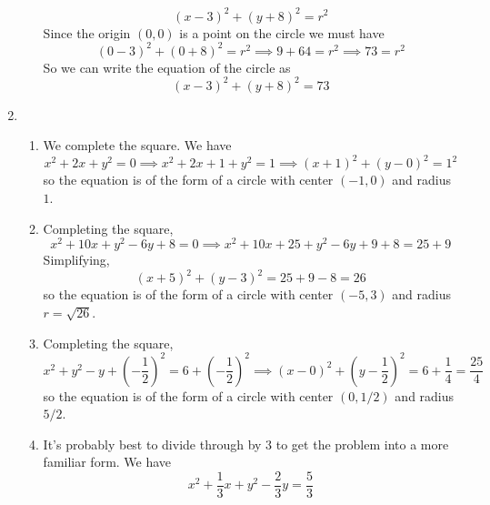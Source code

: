 \documentclass{article}
\newcommand{\ds}{\displaystyle}
\begin{document}
\begin{enumerate}
\begin{enumerate}
\begin{equation*}
      (x-3)^2 + (y+8)^2 = r^2
    \end{equation*}
    Since the origin $(0,0)$ is a point on the circle we must have
    \begin{equation*}
      (0-3)^2 + (0+8)^2 = r^2 \implies 9 + 64 = r^2 \implies 73 = r^2
    \end{equation*}
    So we can write the equation of the circle as
    \begin{equation*}
      (x-3)^2 + (y+8)^2 = 73
    \end{equation*}
  \end{enumerate}
\item %
  \begin{enumerate}
  \item %
    We complete the square.  We have
    \begin{equation*}
      x^2 + 2x + y^2 = 0 \implies x^2 + 2x + 1 + y^2 = 1 \implies
      (x+1)^2 + (y-0)^2 = 1^2
    \end{equation*}
    so the equation is of the form of a circle with center $(-1,0)$
    and radius $1$.
  \item %
    Completing the square,
    \begin{equation*}
      x^2 + 10x + y^2 -6y + 8 = 0 \implies x^2 + 10x + 25 + y^2 -6y +
      9 + 8 = 25 + 9
    \end{equation*}
    Simplifying,
    \begin{equation*}
      (x+5)^2 + (y-3)^2 = 25 + 9 - 8 = 26
    \end{equation*}
    so the equation is of the form of a circle with center $(-5,3)$
    and radius $r=\sqrt{26}$. 
  \item %
    Completing the square,
    \begin{equation*}
      x^2 + y^2 - y + \left(-\frac{1}{2}\right)^2 = 6 +
      \left(-\frac{1}{2}\right)^2
      \implies (x-0)^2 + \left(y-\frac{1}{2}\right)^2 = 6 +
      \frac{1}{4} = \frac{25}{4}
    \end{equation*}
    so the equation is of the form of a circle with center $(0,1/2)$
    and radius $5/2$.
  \item %
    It's probably best to divide through by $3$ to get the problem
    into a more familiar form.  We have
    \begin{equation*}
      x^2 + \frac{1}{3} x + y^2 - \frac{2}{3} y = \frac{5}{3}

\end{equation*}
\end{enumerate}
\end{enumerate}
\end{document}
